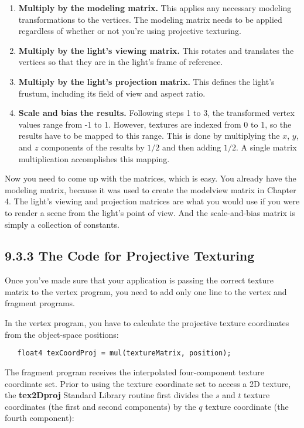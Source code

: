 \documentclass[../main.tex]{subfiles}
\begin{document}
\begin{enumerate}
\item \textbf{Multiply by the modeling matrix.} This applies any necessary modeling transformations to the vertices. The modeling matrix needs to be applied regardless of whether or not you're using projective texturing.
\item \textbf{Multiply by the light's viewing matrix.} This rotates and translates the vertices so that they are in the light's frame of reference.
\item \textbf{Multiply by the light's projection matrix.} This defines the light's frustum, including its field of view and aspect ratio.
\item \textbf{Scale and bias the results.} Following steps 1 to 3, the transformed vertex values range from -1 to 1. However, textures are indexed from 0 to 1, so the results have to be mapped to this range. This is done by multiplying the $x$, $y$, and $z$ components of the results by $1/2$ and then adding $1/2$. A single matrix multiplication accomplishes this mapping.
\end{enumerate}

Now you need to come up with the matrices, which is easy. You already have the modeling matrix, because it was used to create the modelview matrix in Chapter 4. The light's viewing and projection matrices are what you would use if you were to render a scene from the light's point of view. And the scale-and-bias matrix is simply a collection of constants.

\subsection{9.3.3 The Code for Projective Texturing}

Once you've made sure that your application is passing the correct texture matrix to the vertex program, you need to add only one line to the vertex and fragment programs.

In the vertex program, you have to calculate the projective texture coordinates from the object-space positions:

\FloatBarrier
\begin{lstlisting}
   float4 texCoordProj = mul(textureMatrix, position);
\end{lstlisting}
\FloatBarrier

The fragment program receives the interpolated four-component texture coordinate set. Prior to using the texture coordinate set to access a 2D texture, the \textbf{tex2Dproj} Standard Library routine first divides the $s$ and $t$ texture coordinates (the first and second components) by the $q$ texture coordinate (the fourth component):
\end{document}
